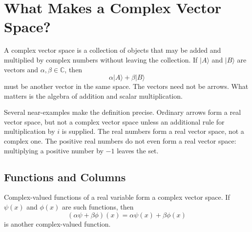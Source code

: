 \begin{classroomqa}
\end{classroomqa}

\section{What Makes a Complex Vector Space?}

A complex vector space is a collection of objects that may be added and
multiplied by complex numbers without leaving the collection. If
\(|A\rangle\) and \(|B\rangle\) are vectors and
\(\alpha,\beta\in\mathbb C\), then
\begin{equation}
 \alpha|A\rangle+\beta|B\rangle
 \label{eq:l02-linear-combination}
\end{equation}
must be another vector in the same space. The vectors need not be arrows.
What matters is the algebra of addition and scalar multiplication.

Several near-examples make the definition precise. Ordinary arrows form a
real vector space, but not a complex vector space unless an additional rule
for multiplication by \(i\) is supplied. The real numbers form a real vector
space, not a complex one. The positive real numbers do not even form a real
vector space: multiplying a positive number by \(-1\) leaves the set.

\subsection{Functions and Columns}

Complex-valued functions of a real variable form a complex vector space. If
\(\psi(x)\) and \(\phi(x)\) are such functions, then
\begin{equation}
 (\alpha\psi+\beta\phi)(x)
 =\alpha\psi(x)+\beta\phi(x)
 \label{eq:l02-function-combination}
\end{equation}
is another complex-valued function.

